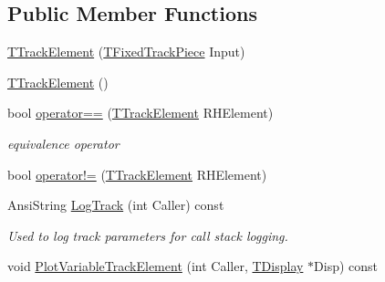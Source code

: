 \subsection*{Public Member Functions}
\begin{DoxyCompactItemize}
\item 
\mbox{\hyperlink{class_t_track_element_a47b976d743e1d92e81ee807c410ef094}{T\+Track\+Element}} (\mbox{\hyperlink{class_t_fixed_track_piece}{T\+Fixed\+Track\+Piece}} Input)
\item 
\mbox{\hyperlink{class_t_track_element_a0f269bad77fe6988e0c2e0a542410d0e}{T\+Track\+Element}} ()
\item 
\mbox{\label{class_t_track_element_aae268d9684a1de26e01dd6578b0f3527}} 
bool \mbox{\hyperlink{class_t_track_element_aae268d9684a1de26e01dd6578b0f3527}{operator==}} (\mbox{\hyperlink{class_t_track_element}{T\+Track\+Element}} R\+H\+Element)
\begin{DoxyCompactList}\small\item\em equivalence operator \end{DoxyCompactList}\item 
bool \mbox{\hyperlink{class_t_track_element_ab8e14338f1059d834353d6c2264b80ee}{operator!=}} (\mbox{\hyperlink{class_t_track_element}{T\+Track\+Element}} R\+H\+Element)
\item 
\mbox{\label{class_t_track_element_a100bff829c4dca820927affde4cb9e57}} 
Ansi\+String \mbox{\hyperlink{class_t_track_element_a100bff829c4dca820927affde4cb9e57}{Log\+Track}} (int Caller) const
\begin{DoxyCompactList}\small\item\em Used to log track parameters for call stack logging. \end{DoxyCompactList}\item 
void \mbox{\hyperlink{class_t_track_element_a453377f8db5e108cb274464333e1100f}{Plot\+Variable\+Track\+Element}} (int Caller, \mbox{\hyperlink{class_t_display}{T\+Display}} $\ast$Disp) const
\end{DoxyCompactItemize}
